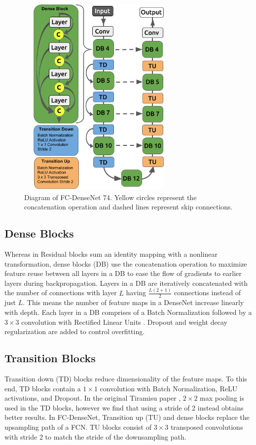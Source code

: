 \documentclass{llncs}
\begin{document}
\begin{figure}
\centering
\includegraphics[width=8cm, height=10cm]{densenet}
\caption{Diagram of FC-DenseNet 74. Yellow circles represent the concatenation operation and dashed lines represent skip connections.}
\end{figure}

\subsection{Dense Blocks}
Whereas in Residual blocks \cite{ResNet} sum an identity mapping with a nonlinear transformation, dense blocks (DB) use the concatenation operation to maximize feature reuse between all layers in a DB to ease the flow of gradients to earlier layers during backpropagation. Layers in a DB are iteratively concatenated with the number of connections with layer $L$ having  $\frac{L\left(2+1\right)}{2}$ connections instead of just $L$. This means the number of feature maps in a DenseNet increase linearly with depth. Each layer in a DB comprises of a Batch Normalization \cite{Batchnorm} followed by a $3 \times 3$ convolution with Rectified Linear Units \cite{ReLU}. Dropout \cite{Dropout} and weight decay regularization are added to control overfitting.  

\subsection{Transition Blocks}
Transition down (TD) blocks reduce dimensionality of the feature maps. To this end, TD blocks contain a $ 1 \times 1$ convolution with Batch Normalization, ReLU activations, and Dropout. In the original Tiramisu paper \cite{Tiramisu}, $2 \times 2$ max pooling is used in the TD blocks, however we find that using a stride of 2 instead obtains better results. In FC-DenseNet, Transition up (TU) and dense blocks replace the upsampling path of a FCN. TU blocks consist of $3 \times 3$ transposed convolutions with stride 2 to match the stride of the downsampling path.   
\end{document}
